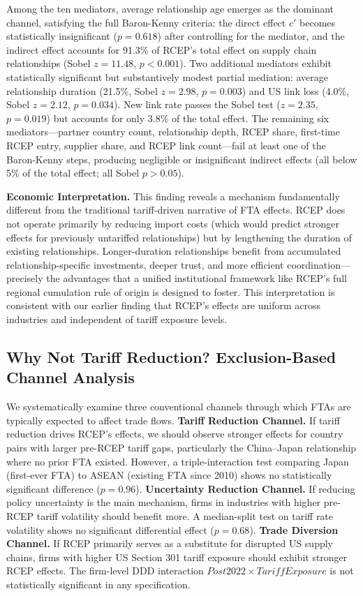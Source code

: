 \documentclass[preprint,12pt,authoryear]{elsarticle}
\begin{document}
Among the ten mediators, average relationship age emerges as the dominant channel, satisfying the full Baron-Kenny criteria: the direct effect $c'$ becomes statistically insignificant ($p=0.618$) after controlling for the mediator, and the indirect effect accounts for 91.3\% of RCEP's total effect on supply chain relationships (Sobel $z = 11.48$, $p < 0.001$). Two additional mediators exhibit statistically significant but substantively modest partial mediation: average relationship duration (21.5\%, Sobel $z=2.98$, $p=0.003$) and US link loss (4.0\%, Sobel $z=2.12$, $p=0.034$). New link rate passes the Sobel test ($z=2.35$, $p=0.019$) but accounts for only 3.8\% of the total effect. The remaining six mediators---partner country count, relationship depth, RCEP share, first-time RCEP entry, supplier share, and RCEP link count---fail at least one of the Baron-Kenny steps, producing negligible or insignificant indirect effects (all below 5\% of the total effect; all Sobel $p>0.05$).

\textbf{Economic Interpretation.} This finding reveals a mechanism fundamentally different from the traditional tariff-driven narrative of FTA effects. RCEP does not operate primarily by reducing import costs (which would predict stronger effects for previously untariffed relationships) but by lengthening the duration of existing relationships. Longer-duration relationships benefit from accumulated relationship-specific investments, deeper trust, and more efficient coordination---precisely the advantages that a unified institutional framework like RCEP's full regional cumulation rule of origin is designed to foster. This interpretation is consistent with our earlier finding that RCEP's effects are uniform across industries and independent of tariff exposure levels.

\subsection{Why Not Tariff Reduction? Exclusion-Based Channel Analysis}

We systematically examine three conventional channels through which FTAs are typically expected to affect trade flows. \textbf{Tariff Reduction Channel.} If tariff reduction drives RCEP's effects, we should observe stronger effects for country pairs with larger pre-RCEP tariff gaps, particularly the China--Japan relationship where no prior FTA existed. However, a triple-interaction test comparing Japan (first-ever FTA) to ASEAN (existing FTA since 2010) shows no statistically significant difference ($p = 0.96$). \textbf{Uncertainty Reduction Channel.} If reducing policy uncertainty is the main mechanism, firms in industries with higher pre-RCEP tariff volatility should benefit more. A median-split test on tariff rate volatility shows no significant differential effect ($p = 0.68$). \textbf{Trade Diversion Channel.} If RCEP primarily serves as a substitute for disrupted US supply chains, firms with higher US Section 301 tariff exposure should exhibit stronger RCEP effects. The firm-level DDD interaction $Post2022 \times TariffExposure$ is not statistically significant in any specification.
\end{document}
